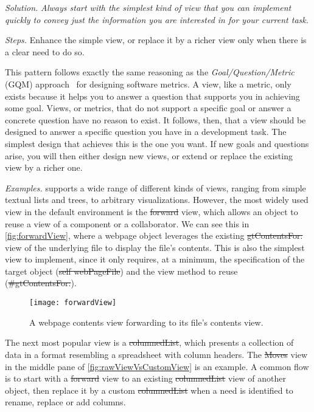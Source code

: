 \documentclass[acmsmall,screen,authorversion,nonacm]{acmart} %
\newcommand\cp[1]{\nbe{Cesare}{#1}{olive}} %
\newcommand{\GT}{\lst{GT}\xspace} %
\newcommand{\patsec}[1]{\noindent\textit{#1.}\xspace}
\begin{document}
\patsec{Solution}
\emph{Always start with the simplest kind of view that you can implement quickly to convey just the information you are interested in for your current task.}

\patsec{Steps}
Enhance the simple view, or replace it by a richer view only when there is a clear need to do so.

This pattern follows exactly the same reasoning as the \emph{Goal/Question/Metric} (GQM) approach~\cite{Basi94a} for designing software metrics.
A view, like a metric, only exists because it helps you to answer a question that supports you in achieving some goal.
Views, or metrics, that do not support a specific goal or answer a concrete question have no reason to exist.
It follows, then, that a view should be designed to answer a specific question you have in a development task.
The simplest design that achieves this is the one you want.
If new goals and questions arise, you will then either design new views, or extend or replace the existing view by a richer one.

\patsec{Examples}
\GT supports a wide range of different kinds of views, ranging from simple textual lists and trees, to arbitrary visualizations.
However, the most widely used view in the default environment is the \st{forward} view, which allows an object to reuse a view of a component or a collaborator.
We can see this in \autoref{fig:forwardView}, where a webpage object leverages the existing \st{gtContentsFor:} view of the underlying file to display the file's contents.
This is also the simplest view to implement, since it only requires, at a minimum, the specification of the target object (\st{self webPageFile}) and the view method to reuse (\st{#gtContentsFor:}).

\begin{figure}[h]
  \texttt{[image: forwardView]}
  \caption{A webpage contents view forwarding to its file's contents view.}
  \label{fig:forwardView}
\end{figure}

The next most popular view is a \st{columnedList}, which presents a collection of data in a format resembling a spreadsheet with column headers.
The \st{Moves} view in the middle pane of \autoref{fig:rawViewVsCustomView} is an example.
A common flow is to start with a \st{forward} view to an existing \st{columnedList} view of another object, then replace it by a custom \st{columnedList} when a need is identified to rename, replace or add columns.
\end{document}
